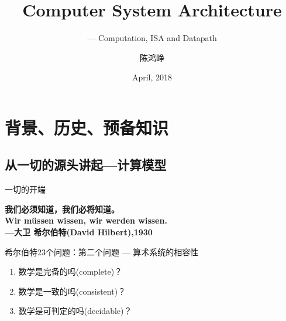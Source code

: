 \documentclass{myslide}
\title{Computer System Architecture}
\subtitle{--- Computation, ISA and Datapath}
\author[chhzh123]{陈鸿峥}
\date[Apr, 2018]{April, 2018}
\begin{document}
\begin{frame}
\titlepage
\end{frame}

\begin{frame}
\tableofcontents[hideallsubsections]
\end{frame}

\section{背景、历史、预备知识}
\begin{frame}
\sectionpage
\end{frame}

\subsection{从一切的源头讲起---计算模型}
\begin{frame}
\subsectionpage
\end{frame}

\begin{frame}{一切的开端}
\begin{center}
\large\textbf{我们必须知道，我们必将知道。}\\
\textbf{Wir m\"ussen wissen, wir werden wissen.}\\
\qquad\qquad\qquad\qquad\qquad\textbf{---大卫 希尔伯特(David Hilbert),1930}
\end{center}
\pause
希尔伯特23个问题：第二个问题 --- 算术系统的相容性
\begin{enumerate}
	\item 数学是完备的吗(complete)？%
	\item 数学是一致的吗(consistent)？%
	\item 数学是可判定的吗(decidable)？%
\end{enumerate}
\end{frame}
\end{document}
